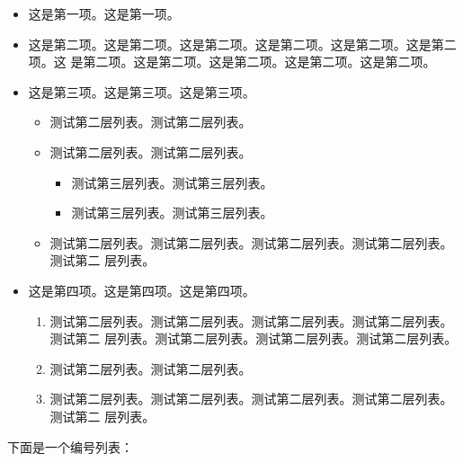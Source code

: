 \begin{itemize}
\item 这是第一项。这是第一项。
\item 这是第二项。这是第二项。这是第二项。这是第二项。这是第二项。这是第二项。这
  是第二项。这是第二项。这是第二项。这是第二项。这是第二项。
\item 这是第三项。这是第三项。这是第三项。
  \begin{itemize}
  \item 测试第二层列表。测试第二层列表。
  \item 测试第二层列表。测试第二层列表。
  \begin{itemize}
     \item 测试第三层列表。测试第三层列表。
     \item 测试第三层列表。测试第三层列表。
  \end{itemize}
  \item 测试第二层列表。测试第二层列表。测试第二层列表。测试第二层列表。测试第二
    层列表。
  \end{itemize}
\item 这是第四项。这是第四项。这是第四项。
  \begin{enumerate}
  \item 测试第二层列表。测试第二层列表。测试第二层列表。测试第二层列表。测试第二
    层列表。测试第二层列表。测试第二层列表。测试第二层列表。
  \item 测试第二层列表。测试第二层列表。
  \item 测试第二层列表。测试第二层列表。测试第二层列表。测试第二层列表。测试第二
    层列表。
  \end{enumerate}
\end{itemize}

下面是一个编号列表：

